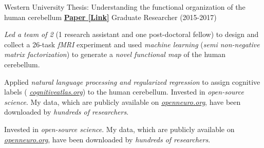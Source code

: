 \begin{cventries}
  \cventry
    {Western University} %
    {Thesis: Understanding the functional organization of the human cerebellum}
    {\href{http://ivrylab.berkeley.edu/uploads/4/1/1/5/41152143/functional_boundaries_in_the_human_cerebellum.pdf}{\textbf{Paper [Link]}}} %
    {Graduate Researcher (2015-2017)} %
    {
      \begin{cvitems} %
      	\item {\textit{Led a team of 2} (1 research assistant and one post-doctoral fellow) to design and collect a 26-task \textit{fMRI} experiment and used \textit{machine learning} (\textit{semi non-negative matrix factorization}) to generate a \textit{novel functional map} of the human cerebellum.}
      	\item {Applied \textit{natural language processing and regularized regression} to assign cognitive labels ( {\href{https://cognitiveatlas.org/}{\textit{cognitiveatlas.org}}}) to the human cerebellum. Invested in \textit{open-source science}. My data, which are publicly available on {\href{https://openneuro.org/datasets/ds002105/versions/1.1.0}{\textit{openneuro.org}}}, have been downloaded by \textit{hundreds of researchers}.}
      	\item {Invested in \textit{open-source science}. My data, which are publicly available on {\href{https://openneuro.org/datasets/ds002105/versions/1.1.0}{\textit{openneuro.org}}}, have been downloaded by \textit{hundreds of researchers}.}
      \end{cvitems}
    }
\end{cventries}
